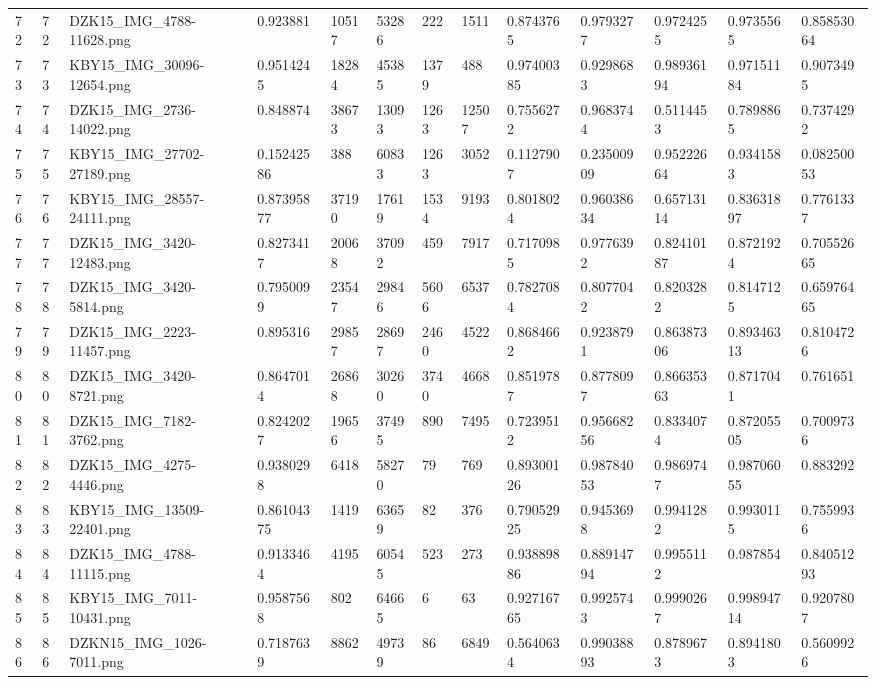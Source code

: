 \documentclass[11pt, a4paper, twoside]{report}
\begin{document}
\begin{longtable}[c]{@{}lllllllllllll@{}}
72 & 72 & DZK15\_IMG\_4788-11628.png & 0.923881 & 10517 & 53286 & 222 & 1511 & 0.8743765 & 0.9793277 & 0.9724255 & 0.9735565 & 0.85853064 \\
73 & 73 & KBY15\_IMG\_30096-12654.png & 0.9514245 & 18284 & 45385 & 1379 & 488 & 0.97400385 & 0.9298683 & 0.98936194 & 0.97151184 & 0.9073495 \\
74 & 74 & DZK15\_IMG\_2736-14022.png & 0.848874 & 38673 & 13093 & 1263 & 12507 & 0.7556272 & 0.9683744 & 0.5114453 & 0.7898865 & 0.7374292 \\
75 & 75 & KBY15\_IMG\_27702-27189.png & 0.15242586 & 388 & 60833 & 1263 & 3052 & 0.1127907 & 0.23500909 & 0.95222664 & 0.9341583 & 0.08250053 \\
76 & 76 & KBY15\_IMG\_28557-24111.png & 0.87395877 & 37190 & 17619 & 1534 & 9193 & 0.8018024 & 0.96038634 & 0.65713114 & 0.83631897 & 0.7761337 \\
77 & 77 & DZK15\_IMG\_3420-12483.png & 0.8273417 & 20068 & 37092 & 459 & 7917 & 0.7170985 & 0.9776392 & 0.82410187 & 0.8721924 & 0.70552665 \\
78 & 78 & DZK15\_IMG\_3420-5814.png & 0.7950099 & 23547 & 29846 & 5606 & 6537 & 0.7827084 & 0.8077042 & 0.8203282 & 0.8147125 & 0.65976465 \\
79 & 79 & DZK15\_IMG\_2223-11457.png & 0.895316 & 29857 & 28697 & 2460 & 4522 & 0.8684662 & 0.9238791 & 0.86387306 & 0.89346313 & 0.8104726 \\
80 & 80 & DZK15\_IMG\_3420-8721.png & 0.8647014 & 26868 & 30260 & 3740 & 4668 & 0.8519787 & 0.8778097 & 0.86635363 & 0.8717041 & 0.761651 \\
81 & 81 & DZK15\_IMG\_7182-3762.png & 0.8242027 & 19656 & 37495 & 890 & 7495 & 0.7239512 & 0.95668256 & 0.8334074 & 0.87205505 & 0.7009736 \\
82 & 82 & DZK15\_IMG\_4275-4446.png & 0.9380298 & 6418 & 58270 & 79 & 769 & 0.89300126 & 0.98784053 & 0.9869747 & 0.98706055 & 0.883292 \\
83 & 83 & KBY15\_IMG\_13509-22401.png & 0.86104375 & 1419 & 63659 & 82 & 376 & 0.79052925 & 0.9453698 & 0.9941282 & 0.9930115 & 0.7559936 \\
84 & 84 & DZK15\_IMG\_4788-11115.png & 0.9133464 & 4195 & 60545 & 523 & 273 & 0.93889886 & 0.88914794 & 0.9955112 & 0.987854 & 0.84051293 \\
85 & 85 & KBY15\_IMG\_7011-10431.png & 0.9587568 & 802 & 64665 & 6 & 63 & 0.92716765 & 0.9925743 & 0.9990267 & 0.99894714 & 0.9207807 \\
86 & 86 & DZKN15\_IMG\_1026-7011.png & 0.7187639 & 8862 & 49739 & 86 & 6849 & 0.5640634 & 0.99038893 & 0.8789673 & 0.8941803 & 0.5609926 \\

\end{longtable}
\end{document}
